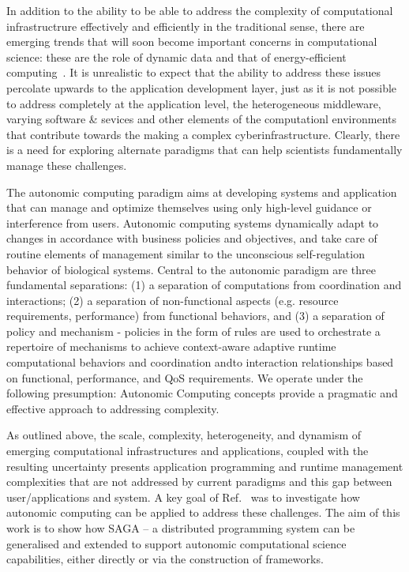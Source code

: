 \documentclass[a4paper,10pt]{article}
\begin{document}
In addition to the ability to be able to address the complexity of
computational infrastructrure effectively and efficiently in the
traditional sense, there are emerging trends that will soon become
important concerns in computational science: these are the role of
dynamic data and that of energy-efficient
computing~\cite{exa-kogge09}. It is unrealistic to expect that the
ability to address these issues percolate upwards to the application
development layer, just as it is not possible to address completely at
the application level, the heterogeneous middleware, varying software
\& sevices and other elements of the computationl environments that
contribute towards the making a complex cyberinfrastructure.  Clearly,
there is a need for exploring alternate paradigms that can help
scientists fundamentally manage these challenges.

The autonomic computing paradigm aims at developing systems and
application that can manage and optimize themselves using only
high-level guidance or interference from users. Autonomic computing
systems dynamically adapt to changes in accordance with business
policies and objectives, and take care of routine elements of
management similar to the unconscious self-regulation behavior of
biological systems. Central to the autonomic paradigm are three
fundamental separations: (1) a separation of computations from
coordination and interactions; (2) a separation of non-functional
aspects (e.g. resource requirements, performance) from functional
behaviors, and (3) a separation of policy and mechanism - policies in
the form of rules are used to orchestrate a repertoire of mechanisms
to achieve context-aware adaptive runtime computational behaviors and
coordination andto interaction relationships based on functional,
performance, and QoS requirements. We operate under the following
presumption: Autonomic Computing concepts provide a pragmatic and
effective approach to addressing complexity.

As outlined above, the scale, complexity, heterogeneity, and dynamism
of emerging computational infrastructures and applications, coupled
with the resulting uncertainty presents application programming and
runtime management complexities that are not addressed by current
paradigms and this gap between user/applications and system.  A key
goal of Ref.~\cite{SOM-CISE10} was to investigate how autonomic
computing can be applied to address these challenges.  The aim of this
work is to show how SAGA -- a distributed programming system can be
generalised and extended to support autonomic computational science
capabilities, either directly or via the construction of frameworks.
\end{document}

